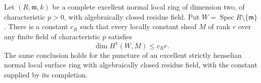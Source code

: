 \begin{theorem}
\label{D:local-p-linear-H1}
Let $(R,\mathfrak m,k)$ be a complete excellent normal local ring of
dimension two, of characteristic $p>0$, with algebraically closed residue
field. Put $W=\operatorname{Spec}R\setminus\{\mathfrak m\}$. There is a
constant $c_R$ such that every locally constant sheaf $M$ of rank $r$
over any finite field of characteristic $p$ satisfies
\[
 \dim H^1(W,M)\le c_Rr.
\]
The same conclusion holds for the puncture of an excellent strictly
henselian normal local surface ring with algebraically closed residue
field, with the constant supplied by its completion.
\end{theorem}
